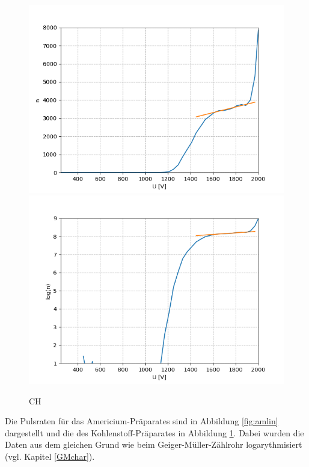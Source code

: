 \documentclass[12pt,a4paper]{article}
\begin{document}
\begin{figure}
\centering
\includegraphics[scale=0.8]{Bilder/Prop/C_lin.PNG}
\includegraphics[scale=0.8]{Bilder/Prop/C_log.PNG}
\caption{CH}
\label{fig:clin}
\end{figure}

Die Pulsraten für das Americium-Präparates sind in Abbildung  \ref{fig:amlin} dargestellt und die des Kohlenstoff-Präparates in Abbildung \ref{fig:clin}. Dabei wurden die Daten aus dem gleichen Grund wie beim Geiger-Müller-Zählrohr logarythmisiert (vgl. Kapitel \ref{GMchar}).\\
\end{document}
